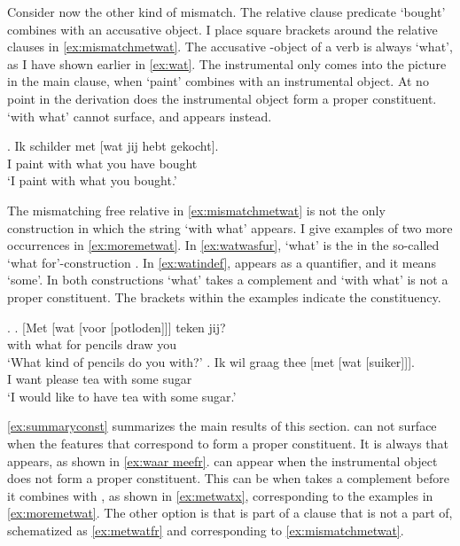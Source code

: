 \documentclass[11pt,a4paper]{article}
\begin{document}
Consider now the other kind of mismatch. The relative clause predicate  `bought' combines with an accusative object. I place square brackets around the relative clauses in \ref{ex:mismatchmetwat}. The accusative -object of a verb is always  `what', as I have shown earlier in \ref{ex:wat}. The instrumental only comes into the picture in the main clause, when  `paint' combines with an instrumental object. At no point in the derivation does the instrumental object form a proper constituent.  `with what' cannot surface, and  appears instead.

\exg. Ik schilder met [wat jij hebt gekocht].\\
 I paint with what you have bought\\
 `I paint with what you bought.'\label{ex:mismatchmetwat}

 The mismatching free relative in \ref{ex:mismatchmetwat} is not the only construction in which the string  `with what' appears. I give examples of two more occurrences in \ref{ex:moremetwat}. In \ref{ex:watwasfur},  `what' is the  in the so-called  `what for'-construction \citep[cf.][]{corver1991}.
 In \ref{ex:watindef},  appears as a quantifier, and it means `some'. In both constructions  `what' takes a complement and  `with what' is not a proper constituent. The brackets within the examples indicate the constituency.

 \ex.\label{ex:moremetwat}
 \ag. [Met [wat [voor [potloden]]] teken jij?\\
  with what for pencils draw you\\
  `What kind of pencils do you with?'\label{ex:watwasfur}
 \bg. Ik wil graag thee [met [wat [suiker]]].\\
  I want please tea with some sugar\\
  `I would like to have tea with some sugar.'\label{ex:watindef}

\ref{ex:summaryconst} summarizes the main results of this section.  can not surface when the features that correspond to  form a proper constituent. It is always  that appears, as shown in \ref{ex:waar meefr}.  can appear when the instrumental object does not form a proper constituent.
This can be when  takes a complement before it combines with , as shown in \ref{ex:metwatx}, corresponding to the examples in \ref{ex:moremetwat}. The other option is that  is part of a clause that  is not a part of, schematized as \ref{ex:metwatfr} and corresponding to \ref{ex:mismatchmetwat}.
\end{document}

